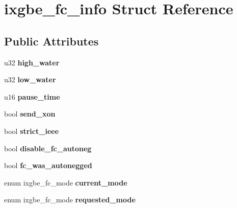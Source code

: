 \hypertarget{structixgbe__fc__info}{
\section{ixgbe\_\-fc\_\-info Struct Reference}
\label{structixgbe__fc__info}
}
\subsection*{Public Attributes}
\begin{DoxyCompactItemize}
\item 
\hypertarget{structixgbe__fc__info_acf38c5555046e2f0f427d77913e87da2}{
u32 {\bfseries high\_\-water}}
\label{structixgbe__fc__info_acf38c5555046e2f0f427d77913e87da2}

\item 
\hypertarget{structixgbe__fc__info_ad8f47b53c036def2b115ef4d5a9f4319}{
u32 {\bfseries low\_\-water}}
\label{structixgbe__fc__info_ad8f47b53c036def2b115ef4d5a9f4319}

\item 
\hypertarget{structixgbe__fc__info_ae09b73a7d6c42272683bec7001da39ba}{
u16 {\bfseries pause\_\-time}}
\label{structixgbe__fc__info_ae09b73a7d6c42272683bec7001da39ba}

\item 
\hypertarget{structixgbe__fc__info_a833ff3888b9cda289b28825e0ab530b4}{
bool {\bfseries send\_\-xon}}
\label{structixgbe__fc__info_a833ff3888b9cda289b28825e0ab530b4}

\item 
\hypertarget{structixgbe__fc__info_a7e7768a0330bf1673da46fc79e17ece5}{
bool {\bfseries strict\_\-ieee}}
\label{structixgbe__fc__info_a7e7768a0330bf1673da46fc79e17ece5}

\item 
\hypertarget{structixgbe__fc__info_ae028df31e14e4e447ee15a7f16fdae70}{
bool {\bfseries disable\_\-fc\_\-autoneg}}
\label{structixgbe__fc__info_ae028df31e14e4e447ee15a7f16fdae70}

\item 
\hypertarget{structixgbe__fc__info_a5450046d501b35b86f3d36a48fc486d2}{
bool {\bfseries fc\_\-was\_\-autonegged}}
\label{structixgbe__fc__info_a5450046d501b35b86f3d36a48fc486d2}

\item 
\hypertarget{structixgbe__fc__info_a236f36411d4f5b865c3056af35ce7ef4}{
enum ixgbe\_\-fc\_\-mode {\bfseries current\_\-mode}}
\label{structixgbe__fc__info_a236f36411d4f5b865c3056af35ce7ef4}

\item 
\hypertarget{structixgbe__fc__info_aa778eaadb924a12dd55ea2afab238533}{
enum ixgbe\_\-fc\_\-mode {\bfseries requested\_\-mode}}
\label{structixgbe__fc__info_aa778eaadb924a12dd55ea2afab238533}

\end{DoxyCompactItemize}


